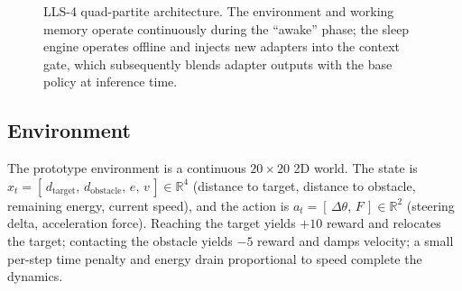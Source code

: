 \documentclass[11pt]{article}
\begin{document}
\begin{figure}[htbp]
\centering
{}
\caption{LLS-4 quad-partite architecture. The environment and working memory operate continuously during the ``awake'' phase; the sleep engine operates offline and injects new adapters into the context gate, which subsequently blends adapter outputs with the base policy at inference time.}
\label{fig:arch}
\end{figure}

\subsection{Environment}
The prototype environment is a continuous $20\times20$ 2D world. The state is $x_t = [\,d_{\text{target}},\,d_{\text{obstacle}},\,e,\,v\,] \in \mathbb{R}^4$ (distance to target, distance to obstacle, remaining energy, current speed), and the action is $a_t = [\,\Delta\theta,\,F\,]\in\mathbb{R}^2$ (steering delta, acceleration force). Reaching the target yields $+10$ reward and relocates the target; contacting the obstacle yields $-5$ reward and damps velocity; a small per-step time penalty and energy drain proportional to speed complete the dynamics.
\end{document}

